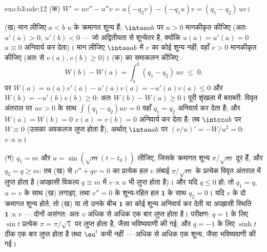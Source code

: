 \begin{solution}{exo:b3:ode:12}
(क) $W' = uv'' - u''v = u(-q_2v) - (-q_1u)v = (q_1 -
q_2)\,uv$।

(ख) मान लीजिए $a < b$ $u$ के क्रमागत शून्य हैं; $\intoo ab$ पर $u >
0$
मानकीकृत कीजिए (अतः $u'(a) > 0$, $u'(b) < 0$ --- जो अद्वितीयता से शून्येतर है,
क्योंकि $u(a) = u'(a) = 0$ $u
\equiv 0$ अनिवार्य कर देता)। मान लीजिए $\intoo ab$ में $v$ का
कोई शून्य नहीं; वहाँ $v > 0$ मानकीकृत कीजिए (अतः  से $v(a), v(b) \geq 0$)।
(क) का समाकलन कीजिए:
\[
W(b) - W(a) = \int_a^b(q_1 - q_2)\,uv \;\leq\; 0 .
\]
पर $W(a) = u(a)v'(a) - u'(a)v(a) = -u'(a)v(a) \leq 0$ और $W(b) = -u'(b)v(b) \geq 0$: अतः $W(b) - W(a) \geq 0$। पूरी शृंखला में बराबरी: विवृत अंतराल
पर $uv > 0$ के साथ $\int(q_1 - q_2)uv = 0$ वहाँ $q_1 = q_2$ अनिवार्य कर देता है; और $W(a) =
W(b) = 0$ $v(a) = v(b) = 0$
अनिवार्य कर देता है; तब $\intcc ab$ पर $W \equiv 0$ (उसका अवकलज लुप्त होता है),
अर्थात् $\intoo ab$ पर $(v/u)' = -W/u^2 = 0$: $v \propto u$।

(ग) $q_1 = m$ और $u = \sin(\sqrt m(t - t_0))$ लीजिए, जिसके क्रमागत शून्य $\pi/\sqrt m$ दूर हैं, और
$q_2 = q \geq
m$: तब (ख) से $v'' + qv = 0$ का प्रत्येक हल $v$ लंबाई $\pi/\sqrt m$ के प्रत्येक
विवृत अंतराल में लुप्त होता है (अपह्रासी विकल्प $q \equiv m$ में $v \propto u$ भी
लुप्त होता है)। और यदि $q \leq 0$ हो: तो $q_1 = q$, $u =
v$ के साथ (ख) लगाइए,
तथा $v'' = 0$ के शून्य-रहित हल $\mathbf 1$ के साथ $q_2 = 0$। यदि $v$ के दो
क्रमागत शून्य होते, तो (ख) या तो उनके बीच $\mathbf 1$ का कोई शून्य अनिवार्य
कर देती या अपह्रासी स्थिति $\mathbf 1 \propto v$ --- दोनों असंगत: अतः $v$ अधिक से
अधिक एक बार लुप्त होता है। परीक्षण: $q = 1$ के लिए $\sin t$ प्रत्येक
$\pi
= \pi/\sqrt1$ पर लुप्त होता है, जैसा भविष्यवाणी की गई; और $q = -1$ के लिए $\sinh t$
ठीक एक बार लुप्त होता है तथा $\eu^t$ कभी नहीं --- अधिक से अधिक एक
शून्य, जैसा भविष्यवाणी की गई।
\end{solution}


